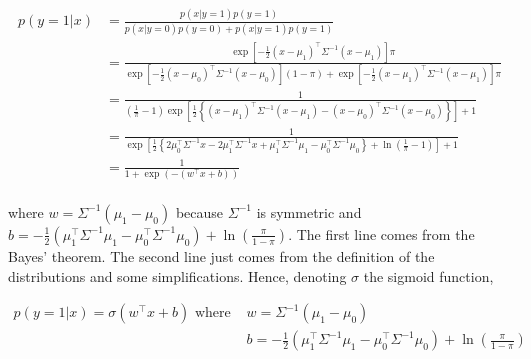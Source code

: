 \documentclass[a4paper, 11pt]{article}
\begin{document}
\begin{enumerate}[label=\alph*]
    \begin{equation*}
        \begin{aligned}
        p \left( y = 1 | x \right) &= \frac{p \left( x | y = 1 \right) p ( y = 1 )}{p(x | y = 0) p(y = 0) + p(x | y = 1) p(y = 1)} \\
        &= \frac{\exp \left[ - \frac{1}{2} \left( x - \mu_{1} \right)^\top \Sigma^{-1} \left( x - \mu_{1} \right) \right] \pi}{\exp \left[ - \frac{1}{2} \left( x - \mu_{0} \right)^\top \Sigma^{-1} \left( x - \mu_{0} \right) \right] \left( 1 - \pi \right) + \exp \left[ - \frac{1}{2} \left( x - \mu_{1} \right)^\top \Sigma^{-1} \left( x - \mu_{1} \right) \right] \pi} \\
        &= \frac{1}{\left( \frac{1}{\pi} - 1 \right) \exp \left[ \frac{1}{2} \left\{ \left( x - \mu_{1} \right)^\top \Sigma^{-1} \left( x - \mu_{1} \right) - \left( x - \mu_{0} \right)^\top \Sigma^{-1} \left( x - \mu_{0} \right) \right\} \right] + 1} \\
        &= \frac{1}{\exp \left[ \frac{1}{2} \left\{ 2 \mu_{0}^\top \Sigma^{-1} x - 2 \mu_{1}^\top \Sigma^{-1} x + \mu_{1}^\top \Sigma^{-1} \mu_{1} - \mu_{0}^\top \Sigma^{-1} \mu_{0} \right\} + \ln \left( \frac{1}{\pi} - 1 \right) \right] + 1} \\
        &= \frac{1}{1 + \exp \left( -(w^\top x + b) \right)} \\
        \end{aligned}
    \end{equation*}
    
    where $w = \Sigma^{-1} \left( \mu_{1} - \mu_{0} \right)$ because $\Sigma^{-1}$ is symmetric and $b = -\frac{1}{2} \left( \mu_{1}^\top \Sigma^{-1} \mu_{1} - \mu_{0}^\top \Sigma^{-1} \mu_{0} \right) + \ln \left(\frac{\pi}{1-\pi}\right)$. The first line comes from the Bayes' theorem. The second line just comes from the definition of the distributions and some simplifications. Hence, denoting $\sigma$ the sigmoid function,
    
    \begin{equation*}
        \boxed{\begin{aligned}
        p \left( y = 1 | x \right) = \sigma \left(w^\top x + b \right) \text{ where } & w = \Sigma^{-1} \left( \mu_{1} - \mu_{0} \right) \\
        & b = -\frac{1}{2} \left( \mu_{1}^\top \Sigma^{-1} \mu_{1} - \mu_{0}^\top \Sigma^{-1} \mu_{0} \right) + \ln \left( \frac{\pi}{1-\pi} \right)
        \end{aligned}}
    \end{equation*}
    

\end{enumerate}
\end{document}
